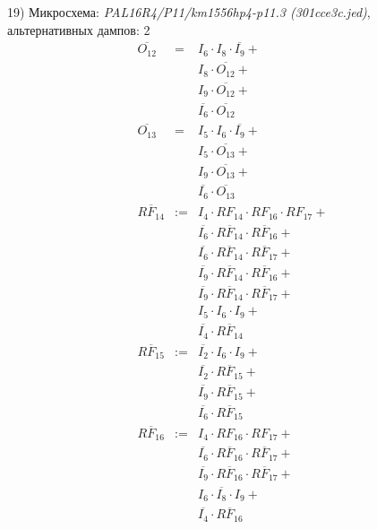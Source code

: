 \documentclass[a4paper,russian]{report}
\begin{document}
19) Микросхема: \emph{PAL16R4/P11/km1556hp4-p11.3  (301cce3c.jed)}, альтернативных дампов: 2
\nopagebreak\begin{eqnarray*}
    \overline{O_{12}} & = & I_{6} \cdotp I_{8} \cdotp \overline{I_{9}} + \\
	& &  I_{8} \cdotp \overline{O_{12}} + \\
	& &  I_{9} \cdotp \overline{O_{12}} + \\
	& &  \overline{I_{6}} \cdotp \overline{O_{12}} \\
    \overline{O_{13}} & = & I_{5} \cdotp I_{6} \cdotp \overline{I_{9}} + \\
	& &  I_{5} \cdotp \overline{O_{13}} + \\
	& &  I_{9} \cdotp \overline{O_{13}} + \\
	& &  \overline{I_{6}} \cdotp \overline{O_{13}} \\
    \overline{RF_{14}} & := & I_{4} \cdotp RF_{14} \cdotp RF_{16} \cdotp RF_{17} + \\
	& &  \overline{I_{6}} \cdotp \overline{RF_{14}} \cdotp \overline{RF_{16}} + \\
	& &  \overline{I_{6}} \cdotp \overline{RF_{14}} \cdotp \overline{RF_{17}} + \\
	& &  \overline{I_{9}} \cdotp \overline{RF_{14}} \cdotp \overline{RF_{16}} + \\
	& &  \overline{I_{9}} \cdotp \overline{RF_{14}} \cdotp \overline{RF_{17}} + \\
	& &  I_{5} \cdotp I_{6} \cdotp I_{9} + \\
	& &  \overline{I_{4}} \cdotp \overline{RF_{14}} \\
    \overline{RF_{15}} & := & \overline{I_{2}} \cdotp I_{6} \cdotp I_{9} + \\
	& &  \overline{I_{2}} \cdotp \overline{RF_{15}} + \\
	& &  \overline{I_{9}} \cdotp \overline{RF_{15}} + \\
	& &  \overline{I_{6}} \cdotp \overline{RF_{15}} \\
    \overline{RF_{16}} & := & I_{4} \cdotp RF_{16} \cdotp RF_{17} + \\
	& &  \overline{I_{6}} \cdotp \overline{RF_{16}} \cdotp \overline{RF_{17}} + \\
	& &  \overline{I_{9}} \cdotp \overline{RF_{16}} \cdotp \overline{RF_{17}} + \\
	& &  I_{6} \cdotp \overline{I_{8}} \cdotp I_{9} + \\
	& &  \overline{I_{4}} \cdotp \overline{RF_{16}} \\

\end{eqnarray*}
\end{document}
